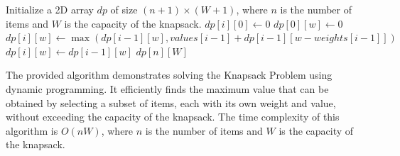 \documentclass[12pt]{book} %
\begin{document}
\begin{algorithm}
\caption{Knapsack Problem}
\begin{algorithmic}[1]
\State Initialize a 2D array $dp$ of size $(n+1) \times (W+1)$, where $n$ is the number of items and $W$ is the capacity of the knapsack.
    \State $dp[i][0] \gets 0$
\EndFor
{}
    \State $dp[0][w] \gets 0$
\EndFor
{}
            \State $dp[i][w] \gets \max(dp[i-1][w], values[i-1] + dp[i-1][w - weights[i-1]])$
        \Else
            \State $dp[i][w] \gets dp[i-1][w]$
        \EndIf
    \EndFor
\EndFor
\Return $dp[n][W]$
\end{algorithmic}
\end{algorithm}

The provided algorithm demonstrates solving the Knapsack Problem using dynamic programming. It efficiently finds the maximum value that can be obtained by selecting a subset of items, each with its own weight and value, without exceeding the capacity of the knapsack. The time complexity of this algorithm is $O(nW)$, where $n$ is the number of items and $W$ is the capacity of the knapsack.

\FloatBarrier
\end{document}

